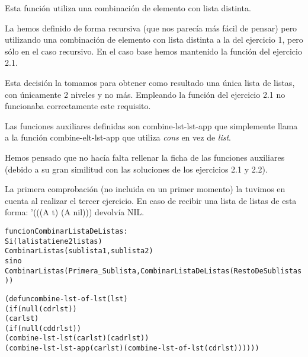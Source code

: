 \begin{aibox}{\comments}
Esta función utiliza una combinación de elemento con lista distinta. 

La hemos definido de forma recursiva (que nos parecía más fácil de pensar) pero utilizando una combinación de elemento con lista distinta a la del ejercicio 1, pero sólo en el caso recursivo. En el caso base hemos mantenido la función del ejercicio 2.1. 

Esta decisión la tomamos para obtener como resultado una única lista de listas, con únicamente 2 niveles y no más. Empleando la función del ejercicio 2.1 no funcionaba correctamente este requisito.

Las funciones auxiliares definidas son combine-lst-lst-app que simplemente llama a la función combine-elt-lst-app que utiliza \emph{cons} en vez de \emph{list}.

Hemos pensado que no hacía falta rellenar la ficha de las funciones auxiliares (debido a su gran similitud con las soluciones de los ejercicios 2.1 y 2.2).

La primera comprobación (no incluida en un primer momento) la tuvimos en cuenta al realizar el tercer ejercicio. En caso de recibir una lista de listas de esta forma: '(((A t) (A nil))) devolvía NIL.

\end{aibox}
\begin{aibox}{\pseudocode}
\begin{alltt}
funcion CombinarListaDeListas:
	Si (la lista tiene 2 listas)
		CombinarListas(sublista1,sublista2)
	sino
		CombinarListas (Primera\_Sublista, CombinarListaDeListas (RestoDeSublistas))
\end{alltt}
\end{aibox}
\begin{aibox}{\code}

\begin{alltt}

(defun combine-lst-of-lst (lst)
	(if (null (cdr lst))
		(car lst)
	(if (null (cddr lst))
			(combine-lst-lst (car lst) (cadr lst))
	(combine-lst-lst-app (car lst) (combine-lst-of-lst (cdr lst))))))


\end{alltt}
\end{aibox}
